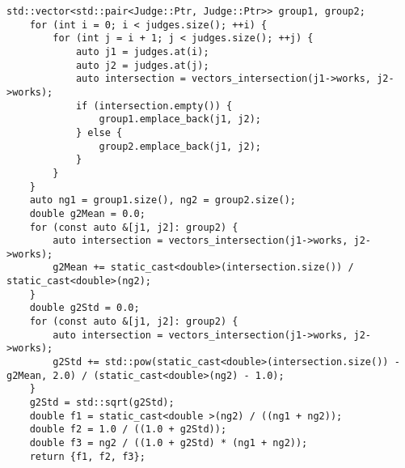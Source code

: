 \documentclass[bwprint]{gmcmthesis}
\begin{document}
\begin{lstlisting}[label=问题1,caption={问题1代码}]
    std::vector<std::pair<Judge::Ptr, Judge::Ptr>> group1, group2;
    for (int i = 0; i < judges.size(); ++i) {
        for (int j = i + 1; j < judges.size(); ++j) {
            auto j1 = judges.at(i);
            auto j2 = judges.at(j);
            auto intersection = vectors_intersection(j1->works, j2->works);
            if (intersection.empty()) {
                group1.emplace_back(j1, j2);
            } else {
                group2.emplace_back(j1, j2);
            }
        }
    }
    auto ng1 = group1.size(), ng2 = group2.size();
    double g2Mean = 0.0;
    for (const auto &[j1, j2]: group2) {
        auto intersection = vectors_intersection(j1->works, j2->works);
        g2Mean += static_cast<double>(intersection.size()) / static_cast<double>(ng2);
    }
    double g2Std = 0.0;
    for (const auto &[j1, j2]: group2) {
        auto intersection = vectors_intersection(j1->works, j2->works);
        g2Std += std::pow(static_cast<double>(intersection.size()) - g2Mean, 2.0) / (static_cast<double>(ng2) - 1.0);
    }
    g2Std = std::sqrt(g2Std);
    double f1 = static_cast<double >(ng2) / ((ng1 + ng2));
    double f2 = 1.0 / ((1.0 + g2Std));
    double f3 = ng2 / ((1.0 + g2Std) * (ng1 + ng2));
    return {f1, f2, f3};
\end{lstlisting}
\end{document}
